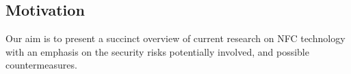 





\subsection{Motivation}
Our aim is to present a succinct overview of current research on NFC technology with an emphasis on the security risks potentially involved, and possible countermeasures.



